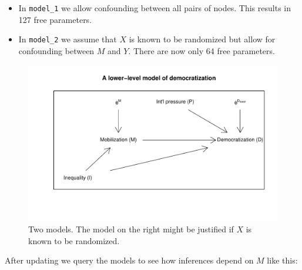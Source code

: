 \documentclass[
  12pt,
]{book}
\begin{document}
\begin{itemize}
\item
  In \texttt{model\_1} we allow confounding between all pairs of nodes. This results in 127 free parameters.
\item
  In \texttt{model\_2} we assume that \(X\) is known to be randomized but allow for confounding between \(M\) and \(Y\). There are now only 64 free parameters.
\end{itemize}

\begin{figure}

{\centering \includegraphics{ii_files/figure-latex/unnamed-chunk-38-1} 

}

\caption{Two models. The model on the right might be justified if $X$ is known to be randomized.}\label{fig:unnamed-chunk-38}
\end{figure}

After updating we query the models to see how inferences depend on \(M\) like this:
\end{document}
